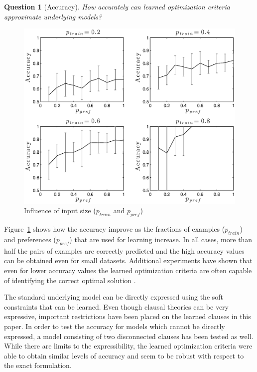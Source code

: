 \documentclass[letterpaper]{article}
\newtheorem{question}{Question}
\theoremstyle{definition}
\begin{document}
\begin{question}[Accuracy]
  How accurately can learned optimization criteria approximate underlying models?
\end{question}

\begin{figure}
  \centering
    \includegraphics[width=1\linewidth]{accuracy}
  \caption{Influence of input size ($p_{train}$ and $p_{pref}$)}
  \label{fig:fractie}
\end{figure}

Figure~\ref{fig:fractie} shows how the accuracy improve as the fractions of examples ($p_{train}$) and preferences ($p_{pref}$) that are used for learning increase.
In all cases, more than half the pairs of examples are correctly predicted and the high accuracy values can be obtained even for small datasets.
Additional experiments have shown that even for lower accuracy values the learned optimization criteria are often capable of identifying the correct optimal solution \cite{kolb2015thesis}.

The standard underlying model can be directly expressed using the soft constraints that can be learned.
Even though clausal theories can be very expressive, important restrictions have been placed on the learned clauses in this paper.
In order to test the accuracy for models which cannot be directly expressed, a model consisting of two disconnected clauses has been tested as well.
While there are limits to the expressibility, the learned optimization criteria were able to obtain similar levels of accuracy and seem to be robust with respect to the exact formulation.
\end{document}
